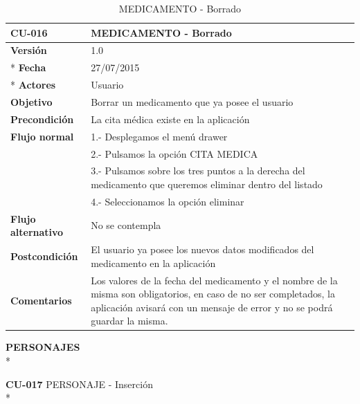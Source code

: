 \documentclass[../pfc.tex]{subfiles}
\begin{document}
		\begin{table}[H]
			\centering
			\begin{tabular}[t]{|p{3cm}|p{9.5cm}|}
				\hline \textbf{CU-016} & \textbf{MEDICAMENTO - Borrado} \\*
				\hline\hline \textbf{Versión} & 1.0 \\ *
				\hline\hline \textbf{Fecha} & 27/07/2015 \\ *
				\hline\textbf{Actores} 	& Usuario\\*
				\hline \textbf{Objetivo} & Borrar un medicamento que ya posee el usuario\\* 			
				\hline \textbf{Precondición} & La cita médica existe en la aplicación\\* 
				\hline \textbf{Flujo normal} & 1.- Desplegamos el menú drawer \\* 
				& 2.- Pulsamos la opción CITA MEDICA\\*	
				& 3.- Pulsamos sobre los tres puntos a la derecha del medicamento que queremos eliminar dentro del listado\\*	
				& 4.- Seleccionamos la opción eliminar\\*	
				\hline \textbf{Flujo alternativo} & No se contempla \\* 
				\hline \textbf{Postcondición} & El usuario ya posee los nuevos datos modificados del medicamento en la aplicación \\* 
				\hline \textbf{Comentarios}   & Los valores de la fecha del medicamento y el nombre de la misma son obligatorios, en caso de no ser completados, la aplicación avisará con un mensaje de error y no se podrá guardar la misma.\\*
				\hline
			\end{tabular}
			\caption{MEDICAMENTO - Borrado}
			\label{tabla:caso016}
		\end{table}
		
		
		
		
		
		
		\textbf{PERSONAJES}\\*
		
		\textbf{CU-017}	PERSONAJE - Inserción\\*
		
\end{document}

